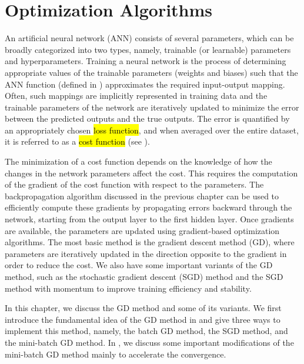 \chapter{Optimization Algorithms}\label{optimization.algorithms.ch}
\vspace{-0.8in}
An artificial neural network (ANN) consists of several parameters, which can be broadly categorized into two types, namely, trainable (or learnable) parameters and hyperparameters. Training a neural network is the process of determining appropriate values of the trainable parameters (weights and biases) such that the ANN function (defined in ) approximates the required input-output mapping. Often, such mappings are implicitly represented in training data and the trainable parameters of the network are iteratively updated to minimize the error between the predicted outputs and the true outputs. The error is quantified by an appropriately chosen \hl{loss function}, and when averaged over the entire dataset, it is referred to as a \hl{cost function} (see ).

The minimization of a cost function depends on the knowledge of how the changes in the network parameters affect the cost.  This requires the computation of the gradient of the cost function with respect to the parameters. The backpropagation algorithm discussed in the previous chapter can be used to efficiently compute these gradients by propagating errors backward through the network, starting from the output layer to the first hidden layer. Once gradients are available, the parameters are updated using gradient-based optimization algorithms. The most basic method is the gradient descent method (GD), where parameters are iteratively updated in the direction opposite to the gradient in order to reduce the cost. We also have some important variants of the GD method, such as the stochastic gradient descent (SGD) method and the SGD method with momentum to improve training efficiency and stability.

In this chapter, we discuss the GD method and some of its variants.  We first introduce the fundamental idea of the GD method in  and give three ways to implement this method, namely, the batch GD method, the SGD method, and the mini-batch GD method. In , we discuss some important modifications of the mini-batch GD method mainly to accelerate the convergence. 

